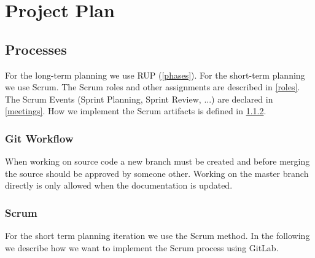 \chapter{Project Plan}

    
    

\section{Processes}
For the long-term planning we use RUP (\ref{phases}).
For the short-term planning we use Scrum.
The Scrum roles and other assignments are described in \ref{roles}.
The Scrum Events (Sprint Planning, Sprint Review, ...) are declared in \ref{meetings}.
How we implement the Scrum artifacts is defined in \ref{scrum}.

\subsection{Git Workflow}
When working on source code a new branch must be created and before merging the source should be approved by someone other.
Working on the master branch directly is only allowed when the documentation is updated.

\subsection{Scrum}
\label{scrum}
For the short term planning iteration we use the Scrum method.
In the following we describe how we want to implement the Scrum process using GitLab.

